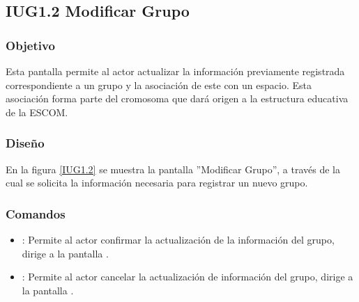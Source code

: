 \subsection{IUG1.2 Modificar Grupo}

\subsubsection{Objetivo}
	Esta pantalla permite al actor actualizar la información previamente registrada correspondiente a un grupo y la asociación de este con un espacio. Esta asociación forma parte del cromosoma que dará origen a la estructura educativa de la ESCOM.

\subsubsection{Diseño}

En la figura \ref{IUG1.2} se muestra la pantalla ''Modificar Grupo'', a través de la cual se solicita la información necesaria para registrar un nuevo grupo.


\subsubsection{Comandos}
\begin{itemize}
	\item {}: Permite al actor confirmar la actualización de la información del grupo, dirige a la pantalla .
	
	\item {}: Permite al actor cancelar la actualización de información del grupo, dirige a la pantalla .
\end{itemize}
